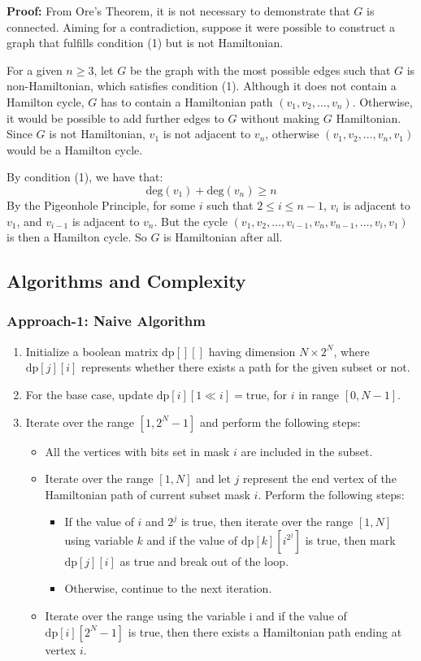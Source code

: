 \documentclass[14pt, times, a4paper]{extarticle}
\begin{document}
\textbf{Proof:} From Ore's Theorem, it is not necessary to demonstrate that $G$ is connected.
Aiming for a contradiction, suppose it were possible to construct a graph that fulfills condition (1) but is not Hamiltonian.

For a given $n \geq 3$, let $G$ be the graph with the most possible edges such that $G$ is non-Hamiltonian, which satisfies condition (1).
Although it does not contain a Hamilton cycle, $G$ has to contain a Hamiltonian path $(v_1, v_2, \ldots, v_n)$.
Otherwise, it would be possible to add further edges to $G$ without making $G$ Hamiltonian.
Since $G$ is not Hamiltonian, $v_1$ is not adjacent to $v_n$, otherwise $(v_1, v_2, \ldots, v_n, v_1)$ would be a Hamilton cycle.

By condition (1), we have that:
\[ \text{deg}(v_1) + \text{deg}(v_n) \geq n \]
By the \gls{Pigeonhole Principle}, for some $i$ such that $2 \leq i \leq n-1$, $v_i$ is adjacent to $v_1$, and $v_{i-1}$ is adjacent to $v_n$.
But the cycle $(v_1, v_2, \ldots, v_{i-1}, v_n, v_{n-1}, \ldots, v_i, v_1)$ is then a Hamilton cycle.
So $G$ is Hamiltonian after all.
\subsection{Algorithms and Complexity}
\subsubsection{Approach-1: Naive Algorithm}
\begin{enumerate}
    \item Initialize a boolean matrix $\text{dp}[][]$ having dimension $N \times 2^N$, where $\text{dp}[j][i]$ represents whether there exists a path for the given subset or not.
    \item For the base case, update $\text{dp}[i][1 \ll i] = \text{true}$, for $i$ in range $[0, N - 1]$.
    \item Iterate over the range $[1, 2^N - 1]$ and perform the following steps:
    \begin{itemize}
    \item All the vertices with bits set in mask $i$ are included in the subset.
    \item Iterate over the range $[1, N]$ and let $j$ represent the end vertex of the Hamiltonian path of current subset mask $i$. Perform the following steps:
    \begin{itemize}
        \item If the value of $i$ and $2^j$ is true, then iterate over the range $[1, N]$ using variable $k$ and if the value of $\text{dp}[k][i ^{2^j}]$ is true, then mark $\text{dp}[j][i]$ as true and break out of the loop.
        \item Otherwise, continue to the next iteration.
    \end{itemize}
    \item Iterate over the range using the variable i and if the value of $\text{dp}[i][2^N - 1]$ is true, then there exists a Hamiltonian path ending at vertex $i$.
\end{itemize}
\end{enumerate}
\end{document}
